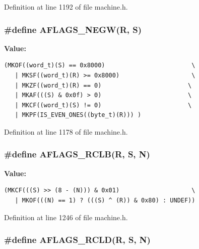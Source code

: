 Definition at line 1192 of file machine.h.
\subsubsection[{AFLAGS\_\-NEGW}]{\setlength{\rightskip}{0pt plus 5cm}\#define AFLAGS\_\-NEGW(R, \/  S)}\label{machine_8h_d817029760f62fa4cab1023f764dc0a9}


\textbf{Value:}

\begin{Code}\begin{verbatim}(MKOF((word_t)(S) == 0x8000)                        \
   | MKSF((word_t)(R) >= 0x8000)                    \
   | MKZF((word_t)(R) == 0)                        \
   | MKAF(((S) & 0x0f) > 0)                        \
   | MKCF((word_t)(S) != 0)                        \
   | MKPF(IS_EVEN_ONES((byte_t)(R))) )
\end{verbatim}
\end{Code}


Definition at line 1178 of file machine.h.
\subsubsection[{AFLAGS\_\-RCLB}]{\setlength{\rightskip}{0pt plus 5cm}\#define AFLAGS\_\-RCLB(R, \/  S, \/  N)}\label{machine_8h_836ece96716e5ef64d308e2e4325ca28}


\textbf{Value:}

\begin{Code}\begin{verbatim}(MKCF(((S) >> (8 - (N))) & 0x01)                    \
   | MKOF(((N) == 1) ? (((S) ^ (R)) & 0x80) : UNDEF))
\end{verbatim}
\end{Code}


Definition at line 1246 of file machine.h.
\subsubsection[{AFLAGS\_\-RCLD}]{\setlength{\rightskip}{0pt plus 5cm}\#define AFLAGS\_\-RCLD(R, \/  S, \/  N)}\label{machine_8h_f1d85922eda6cee080a452a18f67cea8}


